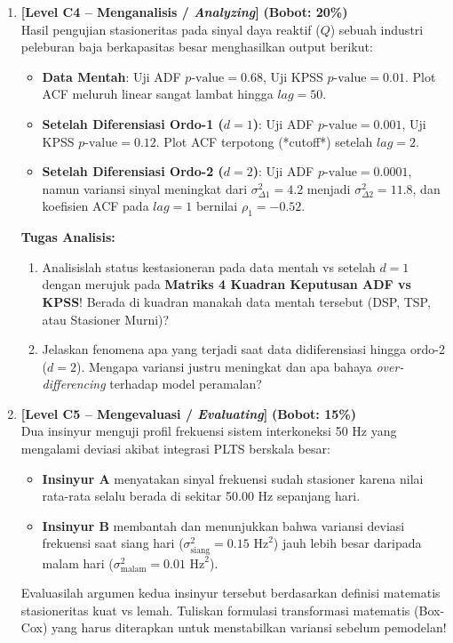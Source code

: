 \documentclass[11pt,a4paper]{article}
\begin{document}
\begin{enumerate}[leftmargin=1.5em, label=\textbf{Soal \arabic*.}]
    \newpage

    \item \textbf{[Level C4 -- Menganalisis / \textit{Analyzing}]} \hfill \textbf{(Bobot: 20\%)} \\
    Hasil pengujian stasioneritas pada sinyal daya reaktif ($Q$) sebuah industri peleburan baja berkapasitas besar menghasilkan output berikut:
    \begin{itemize}
        \item \textbf{Data Mentah}: Uji ADF $p\text{-value} = 0.68$, Uji KPSS $p\text{-value} = 0.01$. Plot ACF meluruh linear sangat lambat hingga $lag = 50$.
        \item \textbf{Setelah Diferensiasi Ordo-1 ($d=1$)}: Uji ADF $p\text{-value} = 0.001$, Uji KPSS $p\text{-value} = 0.12$. Plot ACF terpotong (*cutoff*) setelah $lag = 2$.
        \item \textbf{Setelah Diferensiasi Ordo-2 ($d=2$)}: Uji ADF $p\text{-value} = 0.0001$, namun variansi sinyal meningkat dari $\sigma^2_{\Delta 1} = 4.2$ menjadi $\sigma^2_{\Delta 2} = 11.8$, dan koefisien ACF pada $lag=1$ bernilai $\rho_1 = -0.52$.
    \end{itemize}
    \textbf{Tugas Analisis:}
    \begin{enumerate}[label=\alph*.]
        \item Analisislah status kestasioneran pada data mentah vs setelah $d=1$ dengan merujuk pada \textbf{Matriks 4 Kuadran Keputusan ADF vs KPSS}! Berada di kuadran manakah data mentah tersebut (DSP, TSP, atau Stasioner Murni)?
        \item Jelaskan fenomena apa yang terjadi saat data didiferensiasi hingga ordo-2 ($d=2$). Mengapa variansi justru meningkat dan apa bahaya \textit{over-differencing} terhadap model peramalan?
    \end{enumerate}

    \vspace{0.4cm}

    \item \textbf{[Level C5 -- Mengevaluasi / \textit{Evaluating}]} \hfill \textbf{(Bobot: 15\%)} \\
    Dua insinyur menguji profil frekuensi sistem interkoneksi 50 Hz yang mengalami deviasi akibat integrasi PLTS berskala besar:
    \begin{itemize}
        \item \textbf{Insinyur A} menyatakan sinyal frekuensi sudah stasioner karena nilai rata-rata selalu berada di sekitar 50.00 Hz sepanjang hari.
        \item \textbf{Insinyur B} membantah dan menunjukkan bahwa variansi deviasi frekuensi saat siang hari ($\sigma_{\text{siang}}^2 = 0.15 \text{ Hz}^2$) jauh lebih besar daripada malam hari ($\sigma_{\text{malam}}^2 = 0.01 \text{ Hz}^2$).
    \end{itemize}
    Evaluasilah argumen kedua insinyur tersebut berdasarkan definisi matematis stasioneritas kuat vs lemah. Tuliskan formulasi transformasi matematis (Box-Cox) yang harus diterapkan untuk menstabilkan variansi sebelum pemodelan!


\end{enumerate}
\end{document}
